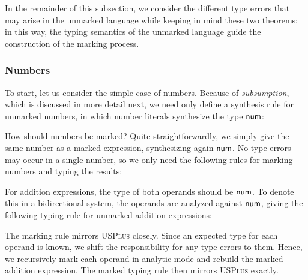 

In the remainder of this subsection, we consider the different type errors that may arise in the
unmarked language while keeping in mind these two theorems; in this way, the typing semantics of the
unmarked language guide the construction of the marking process.

\subsubsection{Numbers}
\label{sec:calculus-numbers}

To start, let us consider the simple case of numbers. Because of \emph{subsumption}, which is
discussed in more detail next, we need only define a synthesis rule for unmarked numbers, in which
number literals synthesize the type $\TNum$:
%
\begin{mathpar}
\end{mathpar}

How should numbers be marked? Quite straightforwardly, we simply give the same number as a marked
expression, synthesizing again $\TNum$. No type errors may occur in a single number, so we only need
the following rules for marking numbers and typing the results: 
%
\begin{mathpar}

\end{mathpar}

For addition expressions, the type of both operands should be $\TNum$. To denote this in a
bidirectional system, the operands are analyzed against $\TNum$, giving the following typing rule
for unmarked addition expressions:
%
\begin{mathpar}
\end{mathpar}

The marking rule mirrors \textsc{USPlus} closely. Since an expected type for each operand is known,
we shift the responsibility for any type errors to them. Hence, we recursively mark each operand in
analytic mode and rebuild the marked addition expression. The marked typing rule then mirrors
\textsc{USPlus} exactly.
%
\begin{mathpar}

\end{mathpar}

